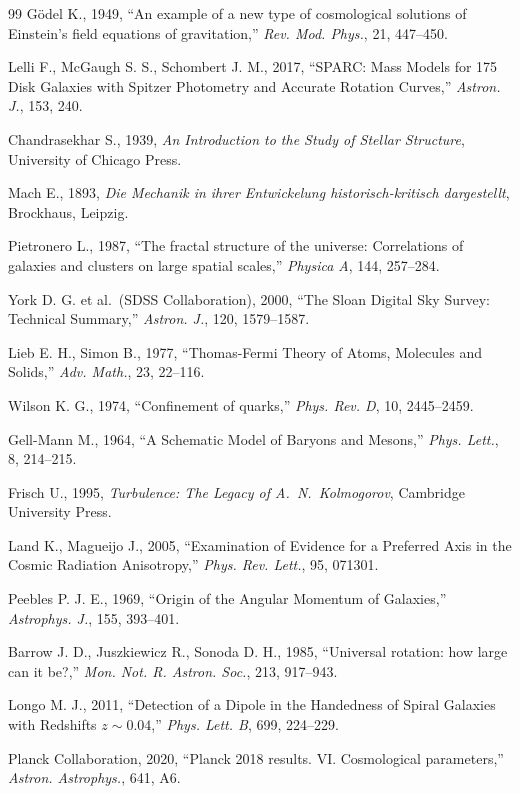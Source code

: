 \documentclass[10pt,a4paper]{article}
\begin{document}
\begin{thebibliography}{99}
G\"odel K., 1949, ``An example of a new type of cosmological solutions of Einstein's field equations of gravitation,'' \emph{Rev. Mod. Phys.}, 21, 447--450.






Lelli F., McGaugh S. S., Schombert J. M., 2017, ``SPARC: Mass Models for 175 Disk Galaxies with Spitzer Photometry and Accurate Rotation Curves,'' \emph{Astron. J.}, 153, 240.


Chandrasekhar S., 1939, \emph{An Introduction to the Study of Stellar Structure}, University of Chicago Press.


Mach E., 1893, \emph{Die Mechanik in ihrer Entwickelung historisch-kritisch dargestellt}, Brockhaus, Leipzig.


Pietronero L., 1987, ``The fractal structure of the universe: Correlations of galaxies and clusters on large spatial scales,'' \emph{Physica A}, 144, 257--284.


York D. G. et al.\ (SDSS Collaboration), 2000, ``The Sloan Digital Sky Survey: Technical Summary,'' \emph{Astron. J.}, 120, 1579--1587.


Lieb E. H., Simon B., 1977, ``Thomas-Fermi Theory of Atoms, Molecules and Solids,'' \emph{Adv. Math.}, 23, 22--116.


Wilson K. G., 1974, ``Confinement of quarks,'' \emph{Phys. Rev. D}, 10, 2445--2459.


Gell-Mann M., 1964, ``A Schematic Model of Baryons and Mesons,'' \emph{Phys. Lett.}, 8, 214--215.


Frisch U., 1995, \emph{Turbulence: The Legacy of A.~N.~Kolmogorov}, Cambridge University Press.


Land K., Magueijo J., 2005, ``Examination of Evidence for a Preferred Axis in the Cosmic Radiation Anisotropy,'' \emph{Phys. Rev. Lett.}, 95, 071301.


Peebles P. J. E., 1969, ``Origin of the Angular Momentum of Galaxies,'' \emph{Astrophys. J.}, 155, 393--401.


Barrow J. D., Juszkiewicz R., Sonoda D. H., 1985, ``Universal rotation: how large can it be?,'' \emph{Mon. Not. R. Astron. Soc.}, 213, 917--943.


Longo M. J., 2011, ``Detection of a Dipole in the Handedness of Spiral Galaxies with Redshifts $z \sim 0.04$,'' \emph{Phys. Lett. B}, 699, 224--229.


Planck Collaboration, 2020, ``Planck 2018 results. VI. Cosmological parameters,'' \emph{Astron. Astrophys.}, 641, A6.


\end{thebibliography}
\end{document}

